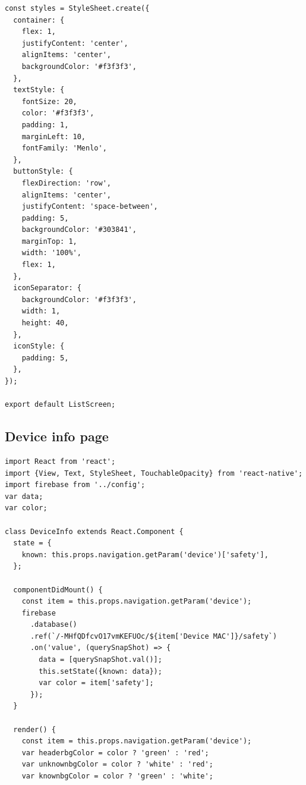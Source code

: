 \documentclass{article}
\begin{document}
\begin{appendices}
\begin{verbatim}
const styles = StyleSheet.create({
  container: {
    flex: 1,
    justifyContent: 'center',
    alignItems: 'center',
    backgroundColor: '#f3f3f3',
  },
  textStyle: {
    fontSize: 20,
    color: '#f3f3f3',
    padding: 1,
    marginLeft: 10,
    fontFamily: 'Menlo',
  },
  buttonStyle: {
    flexDirection: 'row',
    alignItems: 'center',
    justifyContent: 'space-between',
    padding: 5,
    backgroundColor: '#303841',
    marginTop: 1,
    width: '100%',
    flex: 1,
  },
  iconSeparator: {
    backgroundColor: '#f3f3f3',
    width: 1,
    height: 40,
  },
  iconStyle: {
    padding: 5,
  },
});

export default ListScreen;
\end{verbatim}

\subsection{Device info page}
\begin{verbatim}
import React from 'react';
import {View, Text, StyleSheet, TouchableOpacity} from 'react-native';
import firebase from '../config';
var data;
var color;

class DeviceInfo extends React.Component {
  state = {
    known: this.props.navigation.getParam('device')['safety'],
  };

  componentDidMount() {
    const item = this.props.navigation.getParam('device');
    firebase
      .database()
      .ref(`/-MHfQDfcvO17vmKEFUOc/${item['Device MAC']}/safety`)
      .on('value', (querySnapShot) => {
        data = [querySnapShot.val()];
        this.setState({known: data});
        var color = item['safety'];
      });
  }

  render() {
    const item = this.props.navigation.getParam('device');
    var headerbgColor = color ? 'green' : 'red';
    var unknownbgColor = color ? 'white' : 'red';
    var knownbgColor = color ? 'green' : 'white';


\end{verbatim}
\end{appendices}
\end{document}
